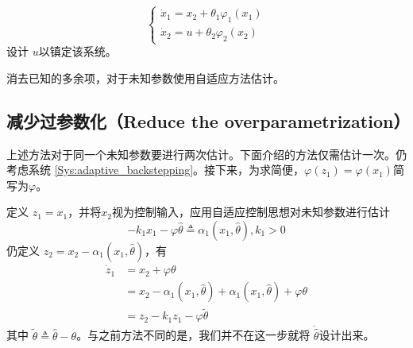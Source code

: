 \begin{problem}
  \[ \left\{\begin{array}{l}
       \dot{x}_1 = x_2 + \theta_1 \varphi_1 (x_1)\\
       \dot{x}_2 = u + \theta_2 \varphi_2 (x_2)
     \end{array}\right. \]
  设计 $u$以镇定该系统。
\end{problem}
\begin{hint}
    消去已知的多余项，对于未知参数使用自适应方法估计。
\end{hint}

\subsection{减少过参数化（Reduce the overparametrization）}

上述方法对于同一个未知参数要进行两次估计。下面介绍的方法仅需估计一次。仍考虑系统 \eqref{Sys:adaptive_backstepping}。接下来，为求简便，$\varphi(z_1)=\varphi(x_1)$简写为$\varphi$。


定义 $z_1 = x_1$，并将$x_2$视为控制输入，应用自适应控制思想对未知参数进行估计
\begin{equation*}
   - k_1 x_1 - \varphi \hat{\theta} \triangleq \alpha_1 (x_1,
  \hat{\theta}),k_1>0
\end{equation*}
仍定义 $z_2 = x_2 - \alpha_1 (x_1, \hat{\theta})$，有
\begin{align*}
  \dot{z}_1 & = x_2 + \varphi \theta\\
  & = x_2 - \alpha_1 (x_1, \hat{\theta}) + \alpha_1 (x_1, \hat{\theta}) +
  \varphi \theta\\
  & = z_2 - k_1 z_1 - \varphi \tilde{\theta}
\end{align*}
其中 $\tilde{\theta} \triangleq \hat{\theta} - \theta$。与之前方法不同的是，我们并不在这一步就将 $\dot{\hat{\theta}}$设计出来。



